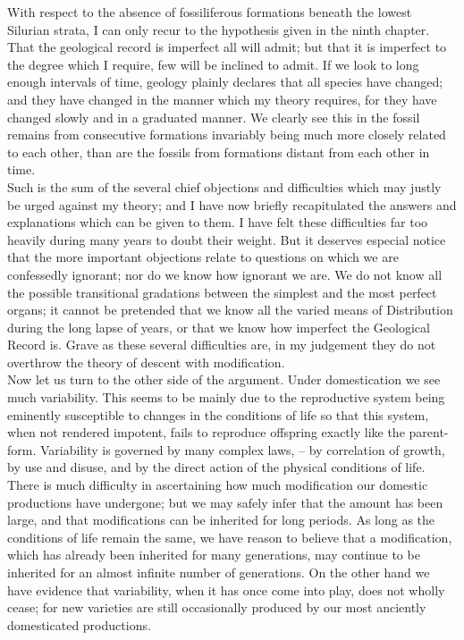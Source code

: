 \indent With respect to the absence of fossiliferous formations beneath the lowest Silurian strata, I can only recur to the hypothesis given in the ninth chapter. That the geological record is imperfect all will admit; but that it is imperfect to the degree which I require, few will be inclined to admit. If we look to long enough intervals of time, geology plainly declares that all species have changed; and they have changed in the manner which my theory requires, for they have changed slowly and in a graduated manner. We clearly see this in the fossil remains from consecutive formations invariably being much more closely related to each other, than are the fossils from formations distant from each other in time.~\\
\indent Such is the sum of the several chief objections and difficulties which may justly be urged against my theory; and I have now briefly recapitulated the answers and explanations which can be given to them. I have felt these difficulties far too heavily during many years to doubt their weight. But it deserves especial notice that the more important objections relate to questions on which we are confessedly ignorant; nor do we know how ignorant we are. We do not know all the possible transitional gradations between the simplest and the most perfect organs; it cannot be pretended that we know all the varied means of Distribution during the long lapse of years, or that we know how imperfect the Geological Record is. Grave as these several difficulties are, in my judgement they do not overthrow the theory of descent with modification.~\\
\indent Now let us turn to the other side of the argument. Under domestication we see much variability. This seems to be mainly due to the reproductive system being eminently susceptible to changes in the conditions of life so that this system, when not rendered impotent, fails to reproduce offspring exactly like the parent-form. Variability is governed by many complex laws, -- by correlation of growth, by use and disuse, and by the direct action of the physical conditions of life. There is much difficulty in ascertaining how much modification our domestic productions have undergone; but we may safely infer that the amount has been large, and that modifications can be inherited for long periods. As long as the conditions of life remain the same, we have reason to believe that a modification, which has already been inherited for many generations, may continue to be inherited for an almost infinite number of generations. On the other hand we have evidence that variability, when it has once come into play, does not wholly cease; for new varieties are still occasionally produced by our most anciently domesticated productions.~\\
